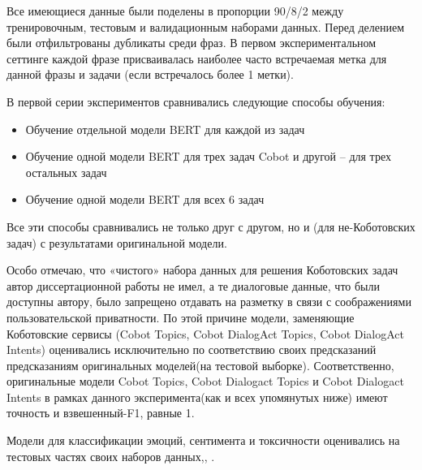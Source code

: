 Все имеющиеся данные были поделены в пропорции 90/8/2 между тренировочным, тестовым и валидационным наборами данных. Перед делением были отфильтрованы дубликаты среди фраз. В первом экспериментальном сеттинге каждой фразе присваивалась наиболее часто встречаемая метка для данной фразы и задачи (если встречалось более 1 метки).

В первой серии экспериментов сравнивались следующие способы обучения:
\begin{itemize}
\item Обучение отдельной модели BERT для каждой из задач
\item Обучение одной модели BERT для трех задач Cobot и другой -- для трех остальных задач
\item Обучение одной модели BERT для всех 6 задач
\end{itemize}

Все эти способы сравнивались не только друг с другом, но и (для не-Коботовских задач) с результатами оригинальной модели. 

Особо отмечаю, что «чистого» набора данных для решения Коботовских задач автор диссертационной работы не имел, а те диалоговые данные, что были доступны автору, было запрещено отдавать на разметку в связи с соображениями пользовательской приватности. По этой причине модели, заменяющие Коботовские сервисы (Cobot Topics, Cobot DialogAct Topics, Cobot DialogAct Intents) оценивались исключительно по соответствию своих предсказаний предсказаниям оригинальных моделей(на тестовой выборке). Соответственно, оригинальные модели Cobot Topics, Cobot Dialogact Topics и Cobot Dialogact Intents в рамках данного эксперимента(как и всех упомянутых ниже) имеют точность и взвешенный-F1, равные 1.

Модели для классификации эмоций, сентимента и токсичности оценивались на тестовых частях своих наборов данных\cite{sst},\cite{na_website_ndo_emo},\cite{toxic_kaggle} . 


